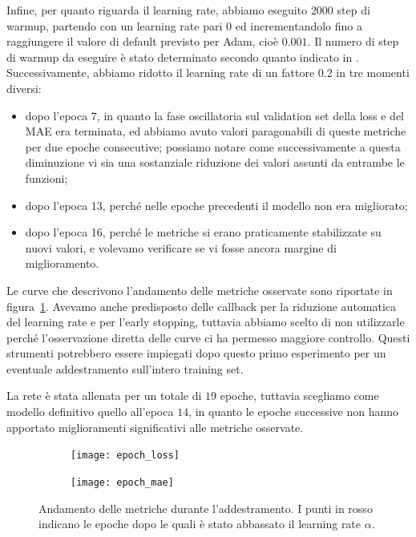 Infine, per quanto riguarda il learning rate, abbiamo eseguito $2000$ step di warmup, partendo con un learning rate pari 0 ed incrementandolo fino a raggiungere il valore di default previsto per Adam, cioè $0.001$. Il numero di step di warmup da eseguire è stato determinato secondo quanto indicato in \cite{adam_warmup}. Successivamente, abbiamo ridotto il learning rate di un fattore 0.2 in tre momenti diversi:
\begin{itemize}
	\item dopo l'epoca 7, in quanto la fase oscillatoria sul validation set della loss e del MAE era terminata, ed abbiamo avuto valori paragonabili di queste metriche per due epoche consecutive; possiamo notare come successivamente a questa diminuzione vi sia una sostanziale riduzione dei valori assunti da entrambe le funzioni;
	\item dopo l'epoca 13, perché nelle epoche precedenti il modello non era migliorato;
	\item dopo l'epoca 16, perché le metriche si erano praticamente stabilizzate su nuovi valori, e volevamo verificare se vi fosse ancora margine di miglioramento.
\end{itemize}
Le curve che descrivono l'andamento delle metriche osservate sono riportate in figura~\ref{fig:metrics}.
Avevamo anche predisposto delle callback per la riduzione automatica del learning rate e per l'early stopping, tuttavia abbiamo scelto di non utilizzarle perché l'osservazione diretta delle curve ci ha permesso maggiore controllo. Questi strumenti potrebbero essere impiegati dopo questo primo esperimento per un eventuale addestramento sull'intero training set.

La rete è stata allenata per un totale di $19$ epoche, tuttavia scegliamo come modello definitivo quello all'epoca $14$, in quanto le epoche successive non hanno apportato miglioramenti significativi alle metriche osservate.

\begin{figure}[ht]
	\centering
	\hfill
	\begin{subfigure}[b]{0.47\textwidth}
		\centering
		\texttt{[image: epoch\_loss]}
	\end{subfigure}
	\hfill
	\begin{subfigure}[b]{0.47\textwidth}
		\centering
		\texttt{[image: epoch\_mae]}
	\end{subfigure}
	\hfill
	\caption{Andamento delle metriche durante l'addestramento. I punti in rosso indicano le epoche dopo le quali è stato abbassato il learning rate $\alpha$.}
	\label{fig:metrics}
\end{figure}
